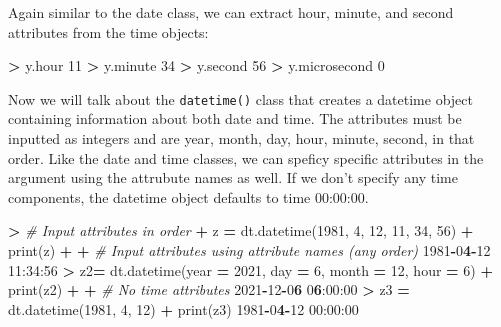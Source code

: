\documentclass[
]{book}
\newenvironment{Shaded}{\begin{snugshade}}{\end{snugshade}}
\newcommand{\BuiltInTok}[1]{#1}
\newcommand{\CommentTok}[1]{\textcolor[rgb]{0.56,0.35,0.01}{\textit{#1}}}
\newcommand{\DecValTok}[1]{\textcolor[rgb]{0.00,0.00,0.81}{#1}}
\newcommand{\ErrorTok}[1]{\textcolor[rgb]{0.64,0.00,0.00}{\textbf{#1}}}
\newcommand{\NormalTok}[1]{#1}
\newcommand{\OperatorTok}[1]{\textcolor[rgb]{0.81,0.36,0.00}{\textbf{#1}}}
\begin{document}
Again similar to the date class, we can extract hour, minute, and second attributes from the time objects:

\begin{Shaded}
\begin{Highlighting}[]
\OperatorTok{\textgreater{}}\NormalTok{ y.hour}
\DecValTok{11}
\OperatorTok{\textgreater{}}\NormalTok{ y.minute}
\DecValTok{34}
\OperatorTok{\textgreater{}}\NormalTok{ y.second}
\DecValTok{56}
\OperatorTok{\textgreater{}}\NormalTok{ y.microsecond}
\DecValTok{0}
\end{Highlighting}
\end{Shaded}

Now we will talk about the \texttt{datetime()} class that creates a datetime object containing information about both date and time. The attributes must be inputted as integers and are year, month, day, hour, minute, second, in that order. Like the date and time classes, we can speficy specific attributes in the argument using the attrubute names as well. If we don't specify any time components, the datetime object defaults to time 00:00:00.

\begin{Shaded}
\begin{Highlighting}[]
\OperatorTok{\textgreater{}} \CommentTok{\# Input attributes in order}
\OperatorTok{+}\NormalTok{ z }\OperatorTok{=}\NormalTok{ dt.datetime(}\DecValTok{1981}\NormalTok{, }\DecValTok{4}\NormalTok{, }\DecValTok{12}\NormalTok{, }\DecValTok{11}\NormalTok{, }\DecValTok{34}\NormalTok{, }\DecValTok{56}\NormalTok{)}
\OperatorTok{+} \BuiltInTok{print}\NormalTok{(z)}
\OperatorTok{+} 
\OperatorTok{+} \CommentTok{\# Input attributes using attribute names (any order)}
\DecValTok{1981}\OperatorTok{{-}}\DecValTok{0}\ErrorTok{4}\OperatorTok{{-}}\DecValTok{12} \DecValTok{11}\NormalTok{:}\DecValTok{34}\NormalTok{:}\DecValTok{56}
\OperatorTok{\textgreater{}}\NormalTok{ z2}\OperatorTok{=}\NormalTok{ dt.datetime(year }\OperatorTok{=} \DecValTok{2021}\NormalTok{, day }\OperatorTok{=} \DecValTok{6}\NormalTok{, month }\OperatorTok{=} \DecValTok{12}\NormalTok{, hour }\OperatorTok{=} \DecValTok{6}\NormalTok{)}
\OperatorTok{+} \BuiltInTok{print}\NormalTok{(z2)}
\OperatorTok{+} 
\OperatorTok{+} \CommentTok{\# No time attributes}
\DecValTok{2021}\OperatorTok{{-}}\DecValTok{12}\OperatorTok{{-}}\DecValTok{0}\ErrorTok{6} \DecValTok{0}\ErrorTok{6}\NormalTok{:}\DecValTok{00}\NormalTok{:}\DecValTok{00}
\OperatorTok{\textgreater{}}\NormalTok{ z3 }\OperatorTok{=}\NormalTok{ dt.datetime(}\DecValTok{1981}\NormalTok{, }\DecValTok{4}\NormalTok{, }\DecValTok{12}\NormalTok{)}
\OperatorTok{+} \BuiltInTok{print}\NormalTok{(z3)}
\DecValTok{1981}\OperatorTok{{-}}\DecValTok{0}\ErrorTok{4}\OperatorTok{{-}}\DecValTok{12} \DecValTok{00}\NormalTok{:}\DecValTok{00}\NormalTok{:}\DecValTok{00}
\end{Highlighting}
\end{Shaded}
\end{document}
